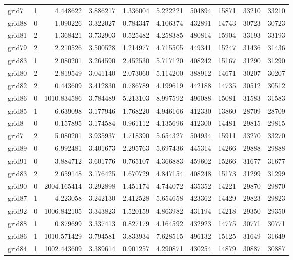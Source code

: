 \begin{longtable}{|l|r|r|r|r|r|r|r|r|r|}
grid7 & 1 & 4.448622 & 3.886217 & 1.336004 & 5.222221 & 504894 & 15871 & 33210 & 33210 \\
grid88 & 0 & 1.090226 & 3.322027 & 0.784347 & 4.106374 & 432891 & 14743 & 30723 & 30723 \\
grid81 & 2 & 1.368421 & 3.732903 & 0.525482 & 4.258385 & 480814 & 15904 & 33193 & 33193 \\
grid79 & 2 & 2.210526 & 3.500528 & 1.214977 & 4.715505 & 449341 & 15247 & 31436 & 31436 \\
grid83 & 1 & 2.080201 & 3.264590 & 2.452530 & 5.717120 & 408242 & 15167 & 31290 & 31290 \\
grid80 & 2 & 2.819549 & 3.041140 & 2.073060 & 5.114200 & 388912 & 14671 & 30207 & 30207 \\
grid82 & 2 & 0.443609 & 3.412830 & 0.786789 & 4.199619 & 442188 & 14735 & 30512 & 30512 \\
grid86 & 0 & 1010.834586 & 3.784489 & 5.213103 & 8.997592 & 496088 & 15081 & 31583 & 31583 \\
grid85 & 1 & 6.639098 & 3.177946 & 1.768220 & 4.946166 & 412330 & 13860 & 28709 & 28709 \\
grid8 & 0 & 0.157895 & 3.174584 & 0.961112 & 4.135696 & 412300 & 14481 & 29815 & 29815 \\
grid7 & 2 & 5.080201 & 3.935937 & 1.718390 & 5.654327 & 504934 & 15911 & 33270 & 33270 \\
grid89 & 0 & 6.992481 & 3.401673 & 2.295763 & 5.697436 & 445314 & 14266 & 29888 & 29888 \\
grid91 & 0 & 3.884712 & 3.601776 & 0.765107 & 4.366883 & 459602 & 15266 & 31677 & 31677 \\
grid83 & 2 & 2.659148 & 3.176425 & 1.670729 & 4.847154 & 408248 & 15173 & 31299 & 31299 \\
grid90 & 0 & 2004.165414 & 3.292898 & 1.451174 & 4.744072 & 435352 & 14221 & 29870 & 29870 \\
grid87 & 1 & 4.223058 & 3.242130 & 2.412528 & 5.654658 & 423362 & 14429 & 29823 & 29823 \\
grid92 & 0 & 1006.842105 & 3.343823 & 1.520159 & 4.863982 & 431194 & 14218 & 29350 & 29350 \\
grid88 & 1 & 0.879699 & 3.337413 & 0.827179 & 4.164592 & 432923 & 14775 & 30771 & 30771 \\
grid86 & 1 & 1010.571429 & 3.794581 & 3.833934 & 7.628515 & 496132 & 15125 & 31649 & 31649 \\
grid84 & 1 & 1002.443609 & 3.389614 & 0.901257 & 4.290871 & 430254 & 14879 & 30887 & 30887 \\

\end{longtable}
